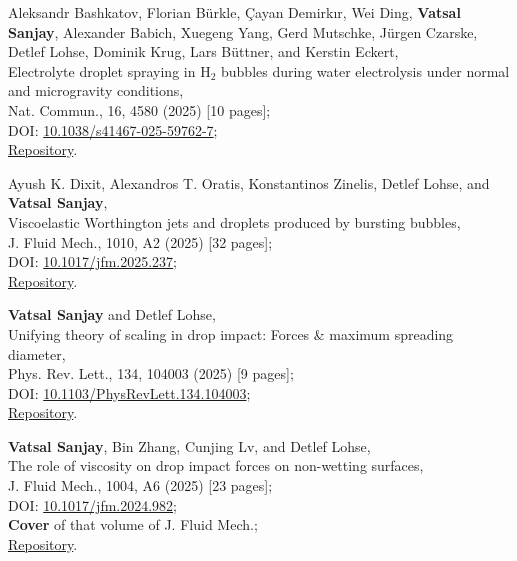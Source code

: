 	\item Aleksandr Bashkatov, Florian Bürkle, Çayan Demirkır, Wei Ding, \textbf{Vatsal Sanjay}, Alexander Babich, Xuegeng Yang, Gerd Mutschke, Jürgen Czarske, Detlef Lohse, Dominik Krug, Lars Büttner, and Kerstin Eckert,\\
	Electrolyte droplet spraying in H$_2$ bubbles during water electrolysis under normal and microgravity conditions,\\
	Nat. Commun., 16, 4580 (2025) [10 pages];\\
	\faFile\hspace{0.2em}DOI: \href{https://doi.org/10.1038/s41467-025-59762-7}{10.1038/s41467-025-59762-7};\\
	\faGithub\hspace{0.2em}\href{https://github.com/VatsalSy/Asymmetries-in-coalescence}{Repository}.

	\item Ayush K. Dixit, Alexandros T. Oratis, Konstantinos Zinelis, Detlef Lohse, and \textbf{Vatsal Sanjay},\\
	Viscoelastic Worthington jets and droplets produced by bursting bubbles,\\
	J. Fluid Mech., 1010, A2 (2025) [32 pages];\\
	\faFile\hspace{0.2em}DOI: \href{https://doi.org/10.1017/jfm.2025.237}{10.1017/jfm.2025.237};\\
	\faGithub\hspace{0.2em}\href{https://github.com/comphy-lab/Viscoelastic-Worthington-jets-and-droplets-produced-by-bursting-bubbles}{Repository}.

	\item \textbf{Vatsal Sanjay} and Detlef Lohse,\\
	Unifying theory of scaling in drop impact: Forces \& maximum spreading diameter,\\
	Phys. Rev. Lett., 134, 104003 (2025) [9 pages];\\
	\faFile\hspace{0.2em}DOI: \href{https://doi.org/10.1103/PhysRevLett.134.104003}{10.1103/PhysRevLett.134.104003};\\
	\faGithub\hspace{0.2em}\href{https://github.com/comphy-lab/Drop-Impact}{Repository}.

	\item \textbf{Vatsal Sanjay}, Bin Zhang, Cunjing Lv, and Detlef Lohse,\\
	The role of viscosity on drop impact forces on non-wetting surfaces,\\
	J. Fluid Mech., 1004, A6 (2025) [23 pages];\\
	\faFile\hspace{0.2em}DOI: \href{https://doi.org/10.1017/jfm.2024.982}{10.1017/jfm.2024.982};\\
	\faStar\hspace{0.2em}\textbf{Cover} of that volume of J. Fluid Mech.;\\
	\faGithub\hspace{0.2em}\href{https://github.com/VatsalSy/The-role-of-viscosity-on-drop-impact-forces}{Repository}.

